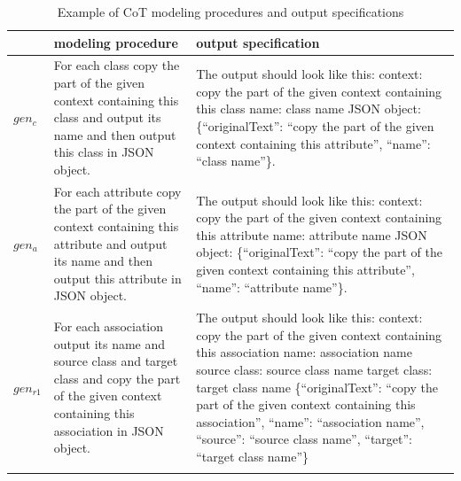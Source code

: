 
\begin{table}[!h]
    \scriptsize
    \centering
    \setlength{\tabcolsep}{0.5em}
\begin{tabular}{@{}l>{\raggedright\arraybackslash}p{}>{\raggedright\arraybackslash}p{}@{}}
         & modeling procedure & output specification \\
    \toprule
    \addlinespace
         $gen_c$ & For each class copy the part of the given context containing this class and output its name and then output this class in JSON object. & The output should look like this: \newline
context: copy the part of the given context containing this class \newline
name: class name \newline
JSON object: \{``originalText'': ``copy the part of the given context containing this attribute'', ``name'': ``class name''\}. \\
\addlinespace

         $gen_a$ & For each attribute copy the part of the given context containing this attribute and output its name and then output this attribute in JSON object. & The output should look like this: \newline
context: copy the part of the given context containing this attribute \newline
name: attribute name \newline
JSON object: \{``originalText'': ``copy the part of the given context containing this attribute'', ``name'': ``attribute name''\}. \\
\addlinespace

         $gen_{r1}$ & For each association output its name and source class and target class and copy the part of the given context containing this association in JSON object. &
The output should look like this: \newline
context: copy the part of the given context containing this association \newline
name: association name \newline
source class: source class name \newline
target class: target class name \newline
\{``originalText'': ``copy the part of the given context containing this association'', ``name'': ``association name'', ``source'': ``source class name'', ``target'': ``target class name''\} \\
	\addlinespace
	\bottomrule
	\addlinespace
	\end{tabular}
	\caption{Example of CoT modeling procedures and output specifications}
	\label{tab:cot-prompt-templates}
\end{table}


